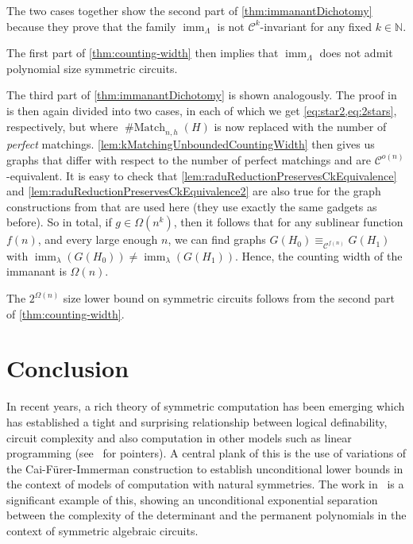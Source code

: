 \documentclass[10pt,a4paper]{article}
\theoremstyle{definition}
\theoremstyle{plain}
\theoremstyle{remark}
\newcommand{\bbN}{\mathbb{N}}
\DeclareMathOperator{\imm}{imm}
\DeclareMathOperator{\Match}{\# Match}
\begin{document}
The two cases together show the second part of \cref{thm:immanantDichotomy} because they prove that the family $\imm_{\Lambda}$ is not $\mathcal{C}^k$-invariant for any fixed $k \in \bbN$. 
	
The first part of \cref{thm:counting-width} then implies that $\imm_{\Lambda}$ does not admit polynomial size symmetric circuits.

The third part of \cref{thm:immanantDichotomy} is shown analogously. The proof in \cite{curticapean2021complexitydichotomyimmanantfamilies} is then again divided into two cases, in each of which we get \cref{eq:star2,eq:2stars}, respectively, but where $\Match_{n,h}(H)$ is now replaced with the number of \emph{perfect} matchings. \cref{lem:kMatchingUnboundedCountingWidth} then gives us graphs that differ with respect to the number of perfect matchings and are $\mathcal{C}^{o(n)}$-equivalent. It is easy to check that \cref{lem:raduReductionPreservesCkEquivalence} and \cref{lem:raduReductionPreservesCkEquivalence2} are also true for the graph constructions from \cite{curticapean2021complexitydichotomyimmanantfamilies} that are used here (they use exactly the same gadgets as before).
So in total, if $g \in \Omega(n^k)$, then it follows that for any sublinear function $f(n)$, and every large enough $n$, we can find graphs $G(H_0) \equiv_{\mathcal{C}^{f(n)}} G(H_1)$ with $\imm_\lambda(G(H_0)) \neq \imm_\lambda(G(H_1))$. Hence, the counting width of the immanant is $\Omega(n)$.

The $2^{\Omega(n)}$ size lower bound on symmetric circuits follows from the second part of \cref{thm:counting-width}.

\section{Conclusion}
	

In recent years, a rich theory of symmetric computation has been emerging which has established a tight and surprising relationship between logical definability, circuit complexity and also computation in other models such as linear programming (see~\cite{dawar_csl2020,dawar_icalp2024} for pointers).  A central plank of this is the use of variations of the Cai-F\"urer-Immerman construction to establish unconditional lower bounds in the context of models of computation with natural symmetries.  The work in~\cite{dawar_symmetric_2020,dawar_symmetric_2025} is a significant example of this, showing an unconditional exponential separation between the complexity of the determinant and the permanent polynomials in the context of symmetric algebraic circuits.
\end{document}
